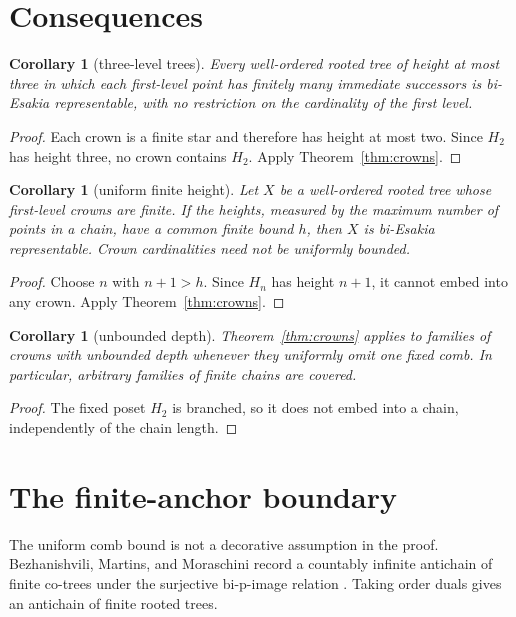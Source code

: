 \documentclass[11pt]{article}
\newtheorem{corollary}[theorem]{Corollary}
\theoremstyle{remark}
\numberwithin{equation}{section}
\begin{document}
\section{Consequences}

\begin{corollary}[three-level trees]
Every well-ordered rooted tree of height at most three in which each first-level
point has finitely many immediate successors is bi-Esakia representable, with
no restriction on the cardinality of the first level.
\end{corollary}

\begin{proof}
Each crown is a finite star and therefore has height at most two. Since $H_2$
has height three, no crown contains $H_2$. Apply Theorem~\ref{thm:crowns}.
\end{proof}

\begin{corollary}[uniform finite height]
Let $X$ be a well-ordered rooted tree whose first-level crowns are finite. If
the heights, measured by the maximum number of points in a chain, have a common
finite bound $h$, then $X$ is bi-Esakia representable. Crown cardinalities need
not be uniformly bounded.
\end{corollary}

\begin{proof}
Choose $n$ with $n+1>h$. Since $H_n$ has height $n+1$, it cannot embed into any
crown. Apply Theorem~\ref{thm:crowns}.
\end{proof}

\begin{corollary}[unbounded depth]
Theorem~\ref{thm:crowns} applies to families of crowns with unbounded depth
whenever they uniformly omit one fixed comb. In particular, arbitrary families
of finite chains are covered.
\end{corollary}

\begin{proof}
The fixed poset $H_2$ is branched, so it does not embed into a chain,
independently of the chain length.
\end{proof}

\section{The finite-anchor boundary}

The uniform comb bound is not a decorative assumption in the proof.
Bezhanishvili, Martins, and Moraschini record a countably infinite antichain of
finite co-trees under the surjective bi-p-image relation
\cite[Proposition 4.15]{ref3}. Taking order duals gives an antichain of finite
rooted trees.
\end{document}
